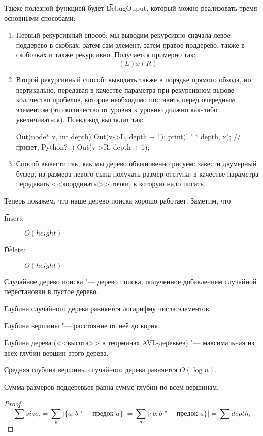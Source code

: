 Также полезной функцией будет \t{DebugOuput}, который можно реализовать тремя основными способами:
\begin{enumerate}
\item
	Первый рекурсивный способ: мы выводим рекурсивно сначала левое поддерево в скобках,
	затем сам элемент, затем правое поддерево, также в скобочках и также рекурсивно.
	Получается примерно так:
	\[ (L) x (R) \]
\item
	Второй рекурсивный способ: выводить также в порядке прямого обхода, но вертикально,
	передавая в качестве параметра при рекурсивном вызове количество пробелов, 
	которое необходимо поставить перед очередным элементом 
	(это количество от уровня к уровню должно как-либо увеличиваться). 
	Псевдокод выглядит так:
\begin{cppcode}
Out(node* v, int depth) {
	Out(v->L, depth + 1);
	print(' ' * depth, x); //привет, Python? :)
	Out(v->R, depth + 1);
}
\end{cppcode}
\item 
	Способ вывести так, как мы дерево обыкновенно рисуем: завести двумерный буфер, 
	из размера левого сына получать размер отступа, в качестве параметра 
	передавать <<координаты>> точки, в которую надо писать.
\end{enumerate}

Теперь покажем, что наше дерево поиска хорошо работает. Заметим, что
\begin{description}
	\item[\t{Insert}:] $O(height)$
	\item[\t{Delete}:] $O(height)$
\end{description}

\begin{Def}
	Случайное дерево поиска "--- дерево поиска, полученное добавлением 
	случайной перестановки в пустое дерево.
\end{Def}

\begin{Def}
	Глубина случайного дерева равняется логарифму числа элементов.
\end{Def}
\begin{Def}
	Глубина вершины "--- расстояние от неё до корня.
\end{Def}
\begin{Def}
	Глубина дерева (<<высота>> в теорминах AVL-деревьев) "--- максимальная из всех глубин
	вершин этого дерева.
\end{Def}

\begin{theorem}{}
	Средняя глубина вершины случайного дерева равняется $O(\log n)$.
\end{theorem}
\begin{lemma}
	Сумма размеров поддеревьев равна сумме глубин по всем вершинам.
\end{lemma}
\begin{proof}
	\[ 
		\sum size_{i} = \sum_{b} |\{a \colon \text{$b$ "--- предок $a$}\}| = 
		\sum_{a} |\{b \colon \text{$b$ "--- предок $a$} \}| = \sum depth_{i} 
	\]
\end{proof}

